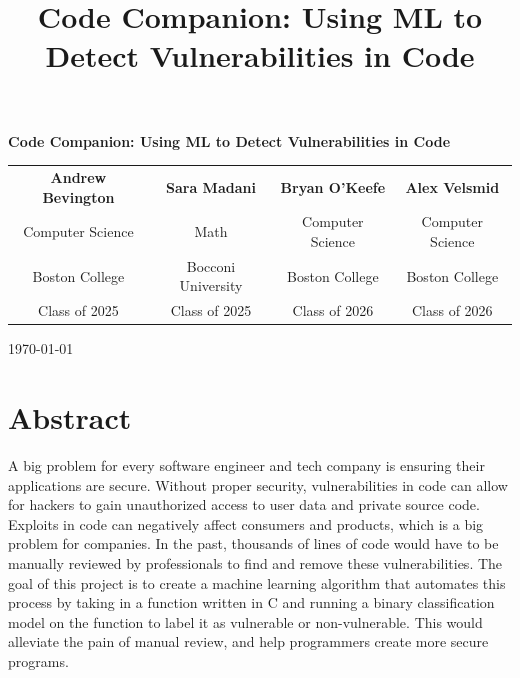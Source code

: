 \documentclass{article}
\title{\Large\textbf{Code Companion: Using ML to Detect Vulnerabilities in Code}}
\date{}  %
\begin{document}
\begin{titlepage}
\begin{center}
\vspace*{2cm}
{\huge\textbf{Code Companion: Using ML to Detect Vulnerabilities in Code}\par}
\vspace{2cm}

\begin{tabular*}{\textwidth}{@{\extracolsep{\fill}} *{4}{c}}
    \textbf{Andrew Bevington} & \textbf{Sara Madani} & \textbf{Bryan O'Keefe} & \textbf{Alex Velsmid} \\[0.0cm]
    Computer Science & Math & Computer Science & Computer Science \\[0.0cm]
    Boston College & Bocconi University & Boston College & Boston College \\[0.0cm]
    Class of 2025 & Class of 2025 & Class of 2026 & Class of 2026 \\
\end{tabular*}

\vfill
\today
\end{center}
\end{titlepage}


\section*{Abstract}
A big problem for every software engineer and tech company is ensuring their applications are
secure. Without proper security, vulnerabilities in code can allow for hackers to gain
unauthorized access to user data and private source code. Exploits in code can negatively
affect consumers and products, which is a big problem for companies. In the past, thousands
of lines of code would have to be manually reviewed by professionals to find and remove these
vulnerabilities. The goal of this project is to create a machine learning algorithm that
automates this process by taking in a function written in C and running a binary classification
model on the function to label it as vulnerable or non-vulnerable. This would alleviate the pain
of manual review, and help programmers create more secure programs.
\end{document}
